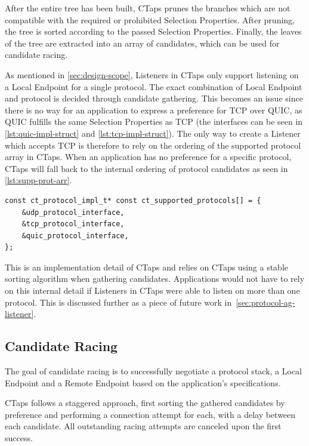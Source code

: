 After the entire tree has been built, CTaps prunes the branches which
are not compatible with the required or prohibited Selection Properties. After pruning,
the tree is sorted according to the passed Selection Properties. Finally, the leaves of the tree
are extracted into an array of candidates, which can be used for candidate racing.

As mentioned in \cref{sec:design-scope}, Listeners in CTaps only support
listening on a Local Endpoint for a single protocol. The exact combination
of Local Endpoint and protocol is decided through candidate gathering.
This becomes an issue since there is no way for an application to express a preference for TCP over
QUIC, as QUIC fulfills the same Selection Properties as TCP
(the interfaces can be seen in \cref{lst:quic-impl-struct} and \cref{lst:tcp-impl-struct}).
The only way to create a Listener
which accepts TCP is therefore to rely on the ordering of the
supported protocol array in CTaps. When an application
has no preference for a specific protocol, CTaps will fall
back to the internal ordering of protocol candidates as seen
in \cref{lst:supp-prot-arr}.

\begin{listing}[htbp]
  \begin{verbatim}
const ct_protocol_impl_t* const ct_supported_protocols[] = {
    &udp_protocol_interface,
    &tcp_protocol_interface,
    &quic_protocol_interface,
};
  \end{verbatim}
  \caption[Internal supported protocol array]{Internal supported protocol array.}
  \label{lst:supp-prot-arr}
\end{listing}

This is an implementation detail of CTaps and relies on CTaps
using a stable sorting algorithm when gathering candidates.
Applications would not have to rely on this internal detail if
Listeners in CTaps were able to listen on more than one protocol.
This is discussed further as a piece of future work in~\cref{sec:protocol-ag-listener}.

\subsection{Candidate Racing} \label{sec:candidateRacing}
The goal of candidate racing is to successfully negotiate a protocol stack, a Local
Endpoint and a Remote Endpoint based on the application's specifications.

CTaps follows a staggered
approach, first sorting the gathered candidates by preference and performing a connection
attempt for each, with a delay between each candidate. All outstanding racing attempts
are canceled upon the first success.

